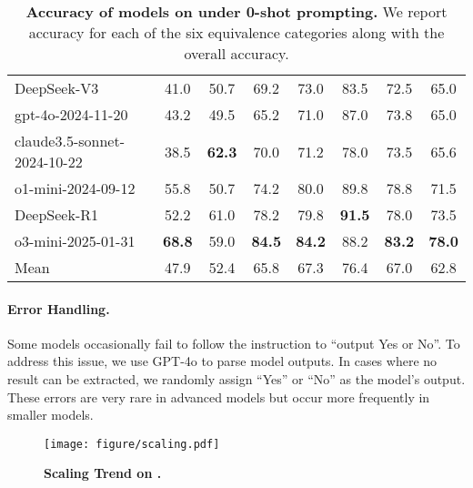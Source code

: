 \begin{table*}[!tb]
\begin{tabular}{lccccccc}
DeepSeek-V3 & 41.0 & 50.7 & 69.2 & 73.0 & 83.5 & 72.5 & 65.0 \\
gpt-4o-2024-11-20 & 43.2 & 49.5 & 65.2 & 71.0 & 87.0 & 73.8 & 65.0 \\
claude3.5-sonnet-2024-10-22 & 38.5 & \textbf{62.3} & 70.0 & 71.2 & 78.0 & 73.5 & 65.6 \\
o1-mini-2024-09-12 & 55.8 & 50.7 & 74.2 & 80.0 & 89.8 & 78.8 & 71.5 \\
DeepSeek-R1 & 52.2 & 61.0 & 78.2 & 79.8 & \textbf{91.5} & 78.0 & 73.5 \\
o3-mini-2025-01-31 & \textbf{68.8} & 59.0 & \textbf{84.5} & \textbf{84.2} & 88.2 & \textbf{83.2} & \textbf{78.0} \\
\midrule
Mean & 47.9 & 52.4 & 65.8 & 67.3 & 76.4 & 67.0 & 62.8 \\
\bottomrule
\end{tabular}
    \caption{\textbf{Accuracy of \numllm models on \name{} under 0-shot prompting.} We report accuracy for each of the six equivalence categories along with the overall accuracy.}
    \label{tab:acc}
\end{table*}


\paragraph{Error Handling.} Some models occasionally fail to follow the instruction to ``output Yes or No''. To address this issue, we use GPT-4o to parse model outputs. In cases where no result can be extracted, we randomly assign ``Yes'' or ``No'' as the model's output. These errors are very rare in advanced models but occur more frequently in smaller models.


\begin{figure}[!tb]
    \centering
    \texttt{[image: figure/scaling.pdf]}
    \caption{\textbf{Scaling Trend on \name.}}
    \label{fig:scaling}
\end{figure}